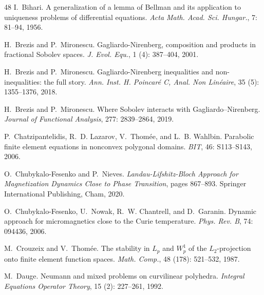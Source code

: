 \documentclass[11pt,reqno]{amsart}
\theoremstyle{definition}
\numberwithin{equation}{section}
\begin{document}
\begin{thebibliography}{48}
	I.~Bihari.
	\newblock A generalization of a lemma of {B}ellman and its application to
	uniqueness problems of differential equations.
	\newblock \emph{Acta Math. Acad. Sci. Hungar.}, 7: 81--94, 1956.
	
	H.~Brezis and P.~Mironescu.
	\newblock Gagliardo-{N}irenberg, composition and products in fractional
	{S}obolev spaces.
	\newblock \emph{J. Evol. Equ.}, 1 (4): 387--404, 2001.
	
	H.~Brezis and P.~Mironescu.
	\newblock Gagliardo-{N}irenberg inequalities and non-inequalities: the full
	story.
	\newblock \emph{Ann. Inst. H. Poincar\'e{} C, Anal. Non Lin\'eaire},
	35 (5): 1355--1376, 2018.
	
	H.~Brezis and P.~Mironescu.
	\newblock Where {S}obolev interacts with {G}agliardo--{N}irenberg.
	\newblock \emph{Journal of Functional Analysis}, 277: 2839--2864,
	2019.
	
	P.~Chatzipantelidis, R.~D. Lazarov, V.~Thom\'ee, and L.~B. Wahlbin.
	\newblock Parabolic finite element equations in nonconvex polygonal domains.
	\newblock \emph{BIT}, 46: S113--S143, 2006.
	
	O.~Chubykalo-Fesenko and P.~Nieves.
	\newblock \emph{Landau-Lifshitz-Bloch Approach for Magnetization Dynamics Close
		to Phase Transition}, pages 867--893.
	\newblock Springer International Publishing, Cham, 2020.
	
	O.~Chubykalo-Fesenko, U.~Nowak, R.~W. Chantrell, and D.~Garanin.
	\newblock Dynamic approach for micromagnetics close to the {C}urie temperature.
	\newblock \emph{Phys. Rev. B}, 74: 094436, 2006.
	
	M.~Crouzeix and V.~Thom\'{e}e.
	\newblock The stability in {$L_p$} and {$W^1_p$} of the {$L_2$}-projection onto
	finite element function spaces.
	\newblock \emph{Math. Comp.}, 48 (178): 521--532, 1987.
	
	M.~Dauge.
	\newblock Neumann and mixed problems on curvilinear polyhedra.
	\newblock \emph{Integral Equations Operator Theory}, 15 (2):
	227--261, 1992.
	

\end{thebibliography}
\end{document}
